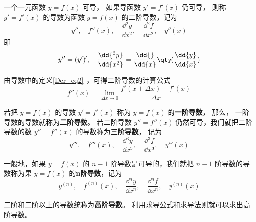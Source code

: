 
\begin{issues}
\end{issues}


一个一元函数 $y=f(x)$ 可导， 如果导函数 $y'=f'(x)$ 仍可导， 则称 $y'=f'(x)$ 的导数为函数 $y=f(x)$ 的二阶导数，记为
\begin{equation}
y'',\quad f''(x),\quad \frac{\dd{^2y}}{\dd{x^2}},\quad \frac{\dd{^2f}}{\dd{x^2}},\quad y''(x)
\end{equation}
即
\begin{equation}
y''=(y')',\quad\frac{\dd{^2y}}{\dd{x^2}}=\frac{\dd{ }}{\dd{x}}\qty(\frac{\dd{y}}{\dd{x}})
\end{equation}

由导数中的定义\autoref{Der_eq2}~，可得二阶导数的计算公式
\begin{equation}
f''(x)=\lim_{\Delta x \to 0} \frac{f'(x+ \Delta x)-f'(x)}{\Delta x}
\end{equation}

若把 $y=f(x)$ 的导数 $y'=f'(x)$ 称为 $y=f(x)$ 的\textbf{一阶导数}， 那么， 一阶导数的导数就称为\textbf{二阶导数}。 若二阶导数 $y''=f''(x)$ 仍然可导，我们就把二阶导数的数 $y''=f''(x)$ 的导数称为\textbf{三阶导数}， 记为
\begin{equation}
y''',\quad f'''(x),\quad \frac{\dd{^3y}}{\dd{x^3}},\quad \frac{\dd{^3f}}{\dd{x^3}},\quad y'''(x)
\end{equation}

一般地，如果 $y=f(x)$ 的 $n-1$ 阶导数是可导的，我们就把 $n-1$ 阶导数的导数称为果 $y=f(x)$ 的\textbf{n阶导数}，记为
\begin{equation}
y^{(n)},\quad f^{(n)}(x),\quad \frac{\dd{^ny}}{\dd{x^n}},\quad \frac{\dd{^nf}}{\dd{x^n}},\quad y^{(n)}(x)
\end{equation}

二阶和二阶以上的导数统称为\textbf{高阶导数}。 利用求导公式和求导法则就可以求出高阶导数。

